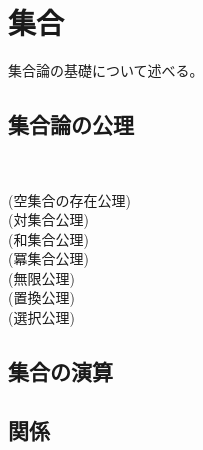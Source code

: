 \documentclass[report]{jlreq}
\begin{document}
%
\chapter{集合}

集合論の基礎について述べる。

%
\section{集合論の公理}

\begin{definition}[集合論の公理系]
    ~
    \begin{description}
        \item[(空集合の存在公理)] 
        \item[(対集合公理)]
        \item[(和集合公理)]
        \item[(冪集合公理)]
        \item[(無限公理)]
        \item[(置換公理)]
        \item[(選択公理)]
    \end{description}
\end{definition}

%
\section{集合の演算}


\begin{definition}[識別和と非交和]
    \TODO{}
\end{definition}

%
\section{関係}

\TODO{}

%
\end{document}
